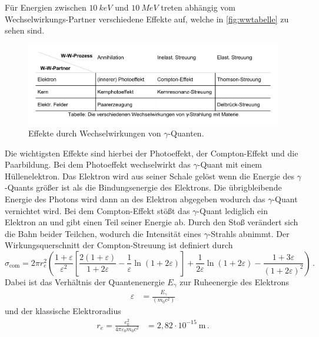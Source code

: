 Für Energien zwischen $\qty{10}{keV}$ und $\qty{10}{MeV}$ treten abhängig vom Wechselwirkungs-Partner
verschiedene Effekte auf, welche in \autoref{fig:wwtabelle} zu sehen sind.
\begin{figure}
    \centering
    \includegraphics[width=\linewidth]{pictures/wwtabelle.pdf}
    \caption{Effekte durch Wechselwirkungen von $\gamma$-Quanten. \cite{v704}}
    \label{fig:wwtabelle}
\end{figure}

Die wichtigsten Effekte sind hierbei der Photoeffekt, der Compton-Effekt und die Paarbildung. 
Bei dem Photoeffekt wechselwirkt das $\gamma$-Quant mit einem Hüllenelektron. 
Das Elektron wird aus seiner Schale gelöst wenn die Energie des $\gamma$-Quants größer ist als die Bindungsenergie des Elektrons. 
Die übrigbleibende Energie des Photons wird dann an des Elektron abgegeben wodurch das $\gamma$-Quant vernichtet wird. 
Bei dem Compton-Effekt stößt das $\gamma$-Quant lediglich ein Elektron an und gibt einen Teil seiner Energie ab. 
Durch den Stoß verändert sich die Bahn beider Teilchen, wodurch die Intensität eines $\gamma$-Strahls abnimmt. 
Der Wirkungsquerschnitt der Compton-Streuung ist definiert durch
\begin{equation} \label{eq:Compton}
    \sigma_{\text{com}} = 
    2 \pi r_{e}^{2} 
    \left(
        \frac{1+\varepsilon}{\varepsilon^{2}} 
        \left[
              \frac{2(1+\varepsilon)}{1+2 \varepsilon}-\frac{1}{\varepsilon} \ln (1+2 \varepsilon) 
        \right] 
        +\frac{1}{2 \varepsilon} \ln (1+2 \varepsilon)-\frac{1+3 \varepsilon}{(1+2 \varepsilon)^{2}}
    \right) \, .
\end{equation}
Dabei ist das Verhältnis der Quantenenergie $E_\gamma$ zur Ruheenergie des Elektrons 
\begin{align*}
    \varepsilon &= \frac{E_\gamma}{(m_0 c^2)} 
\end{align*}
und der klassische Elektroradius
\begin{align*}
    r_{e} = \frac{e_{0}^{2}}{4 \pi \varepsilon_{0} m_{0} c^{2}} &= 2,82 \cdot 10^{-15} \mathrm{~m} \, .
\end{align*}

